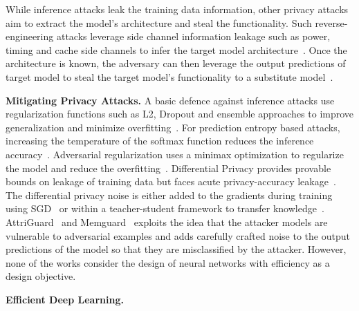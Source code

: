 While inference attacks leak the training data information, other privacy attacks aim to extract the model's architecture and steal the functionality.
Such reverse-engineering attacks leverage side channel information leakage such as power, timing and cache side channels to infer the target model architecture~\cite{236204,hong2019security,duddu2018stealing,10.1145/3274694.3274696,DBLP:journals/corr/abs-1808-04761}.
Once the architecture is known, the adversary can then leverage the output predictions of target model to steal the target model's functionality to a substitute model~\cite{10.5555/3241094.3241142,jacson2018ijcnn}.


\noindent\textbf{Mitigating Privacy Attacks.} A basic defence against inference attacks use regularization functions such as L2, Dropout and ensemble approaches to improve generalization and minimize overfitting~\cite{salem2018ml,shokri2017membership}.
For prediction entropy based attacks, increasing the temperature of the softmax function reduces the inference accuracy~\cite{shokri2017membership}.
Adversarial regularization uses a minimax optimization to regularize the model and reduce the overfitting~\cite{DBLP:conf/ccs/NasrSH18}.
Differential Privacy provides provable bounds on leakage of training data but faces acute privacy-accuracy leakage~\cite{236254}.
The differential privacy noise is either added to the gradients during training using SGD~\cite{Abadi:2016:DLD:2976749.2978318} or within a teacher-student framework to transfer knowledge~\cite{papernot2016semi}.
AttriGuard~\cite{217523} and Memguard~\cite{10.1145/3319535.3363201} exploits the idea that the attacker models are vulnerable to adversarial examples and adds carefully crafted noise to the output predictions of the model so that they are misclassified by the attacker.
However, none of the works consider the design of neural networks with efficiency as a design objective.


\noindent\textbf{Efficient Deep Learning.}


